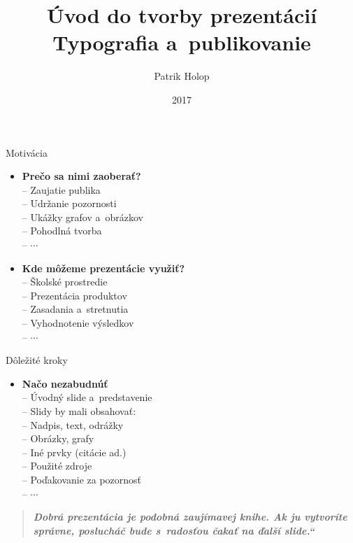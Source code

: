 \documentclass[mode=present,paper=a4paper,orient=landscape, style=sailor]{powerdot}
\title{Úvod do tvorby prezentácií\\Typografia a~publikovanie}
\author{Patrik Holop}
\date{2017}
\newcommand{\myuv}[1]{\quotedblbase#1\textquotedblleft}
\begin{document}
\maketitle

\begin{slide}{Motivácia}
\begin{itemize}
\item \textbf{Prečo sa nimi zaoberať?}\\
	-- Zaujatie publika\\
	-- Udržanie pozornosti\\
	-- Ukážky grafov a~obrázkov\\
	-- Pohodlná tvorba\\
	-- $\cdots$\\
\end{itemize}
\begin{itemize}
\item \textbf{Kde môžeme prezentácie využiť?}\\
	-- Školské prostredie\\
	-- Prezentácia produktov\\
	-- Zasadania a~stretnutia\\
	-- Vyhodnotenie výsledkov\\
	-- $\cdots$\\
\end{itemize}
\end{slide}

\begin{slide}{Dôležité kroky}
\begin{itemize}
\item \textbf{Načo nezabudnúť}\\
	-- Úvodný slide a~predstavenie\\
	-- Slidy by mali obsahovať:\\
	\hspace{1.5em}  -- Nadpis, text, odrážky\\
	\hspace{1.5em}  -- Obrázky, grafy\\
	\hspace{1.5em}	-- Iné prvky (citácie ad.)\\			  	  
	-- Použité zdroje\\
	-- Poďakovanie za pozornosť\\
	-- $\cdots$\\
\end{itemize}
\begin{quotation}
\textit{\bfseries \myuv{Dobrá prezentácia je podobná zaujímavej knihe. Ak ju vytvoríte správne, poslucháč bude s~radosťou čakať na ďalší slide.}}
\end{quotation}
\end{slide}
\end{document}
